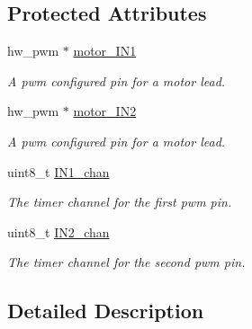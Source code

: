 \subsection*{Protected Attributes}
\begin{DoxyCompactItemize}
\item 
hw\+\_\+pwm $\ast$ \hyperlink{classMotor_ac5a66a53cd8f15873185f374a0b3daa9}{motor\+\_\+\+I\+N1}\hypertarget{classMotor_ac5a66a53cd8f15873185f374a0b3daa9}{}\label{classMotor_ac5a66a53cd8f15873185f374a0b3daa9}

\begin{DoxyCompactList}\small\item\em A pwm configured pin for a motor lead. \end{DoxyCompactList}\item 
hw\+\_\+pwm $\ast$ \hyperlink{classMotor_a2e359d8bde1615bb483209aa4a0f948d}{motor\+\_\+\+I\+N2}\hypertarget{classMotor_a2e359d8bde1615bb483209aa4a0f948d}{}\label{classMotor_a2e359d8bde1615bb483209aa4a0f948d}

\begin{DoxyCompactList}\small\item\em A pwm configured pin for a motor lead. \end{DoxyCompactList}\item 
uint8\+\_\+t \hyperlink{classMotor_a25e145c9db093eba575a76db11429cd0}{I\+N1\+\_\+chan}\hypertarget{classMotor_a25e145c9db093eba575a76db11429cd0}{}\label{classMotor_a25e145c9db093eba575a76db11429cd0}

\begin{DoxyCompactList}\small\item\em The timer channel for the first pwm pin. \end{DoxyCompactList}\item 
uint8\+\_\+t \hyperlink{classMotor_adf38bf5b263a743bb4ce188cc1188c7b}{I\+N2\+\_\+chan}\hypertarget{classMotor_adf38bf5b263a743bb4ce188cc1188c7b}{}\label{classMotor_adf38bf5b263a743bb4ce188cc1188c7b}

\begin{DoxyCompactList}\small\item\em The timer channel for the second pwm pin. \end{DoxyCompactList}\end{DoxyCompactItemize}


\subsection{Detailed Description}


